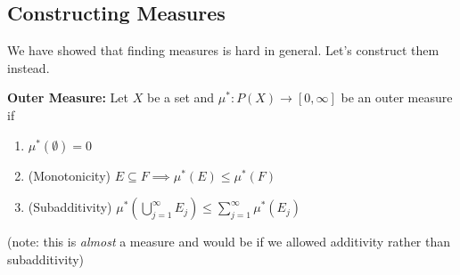 \documentclass[12pt]{report}
\newcommand{\sub}{\subseteq}
\begin{document}
    \subsection*{Constructing Measures}
        We have showed that finding measures is hard in general. Let's construct them instead. 

        \textbf{Outer Measure:} Let $X$ be a set and $\mu^*: P(X) \to [0, \infty]$ be an outer measure if
        \begin{enumerate}
            \item $\mu^*(\emptyset) = 0$
            \item (Monotonicity) $E \sub F \implies \mu^*(E) \leq \mu^*(F)$
            \item (Subadditivity) $\mu^*\left(\bigcup_{j=1}^{\infty} E_j\right) \leq \sum_{j=1}^{\infty} \mu^*(E_j)$
        \end{enumerate}
        (note: this is \emph{almost} a measure and would be if we allowed additivity rather than subadditivity)
\end{document}
